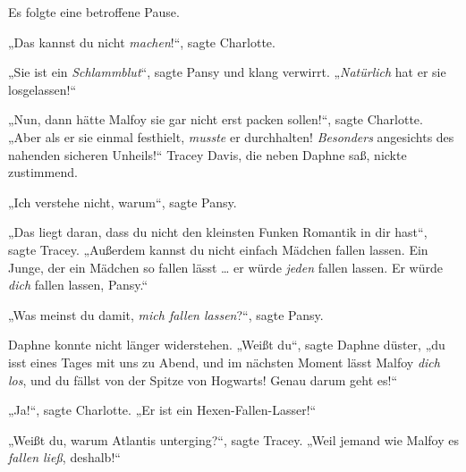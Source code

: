 Es folgte eine betroffene Pause.

„Das kannst du nicht \emph{machen}!“, sagte Charlotte.

„Sie ist ein \emph{Schlammblut}“, sagte Pansy und klang verwirrt. „\emph{Natürlich} hat er sie losgelassen!“

„Nun, dann hätte Malfoy sie gar nicht erst packen sollen!“, sagte Charlotte. „Aber als er sie einmal festhielt, \emph{musste} er durchhalten! \emph{Besonders} angesichts des nahenden sicheren Unheils!“ Tracey Davis, die neben Daphne saß, nickte zustimmend.

„Ich verstehe nicht, warum“, sagte Pansy.

„Das liegt daran, dass du nicht den kleinsten Funken Romantik in dir hast“, sagte Tracey. „Außerdem kannst du nicht einfach Mädchen fallen lassen. Ein Junge, der ein Mädchen so fallen lässt … er würde \emph{jeden} fallen lassen. Er würde \emph{dich} fallen lassen, Pansy.“

„Was meinst du damit, \emph{mich fallen lassen}?“, sagte Pansy.

Daphne konnte nicht länger widerstehen. „Weißt du“, sagte Daphne düster, „du isst eines Tages mit uns zu Abend, und im nächsten Moment lässt Malfoy \emph{dich los}, und du fällst von der Spitze von Hogwarts! Genau darum geht es!“

„Ja!“, sagte Charlotte. „Er ist ein Hexen-Fallen-Lasser!“

„Weißt du, warum Atlantis unterging?“, sagte Tracey. „Weil jemand wie Malfoy es \emph{fallen ließ}, deshalb!“

